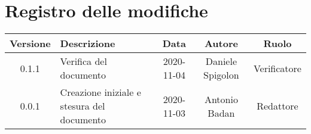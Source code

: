 \section*{Registro delle modifiche}

\begin{center}
	\begin{longtable}{|c|p{5cm}|c|c|c|}
	\hline
	\rowcolor{lighter-grayer}
	\textbf{Versione} & \textbf{Descrizione} & \textbf{Data} & \textbf{Autore} & \textbf{Ruolo} \\
	\hline
	\endfirsthead


	\hline
	0.1.1 & Verifica del documento & 2020-11-04 & Daniele Spigolon & Verificatore \\
	\hline
	0.0.1 & Creazione iniziale e stesura del documento & 2020-11-03 & Antonio Badan & Redattore \\
	\hline
	\end{longtable}
\end{center}